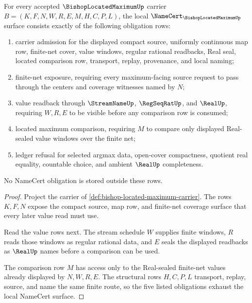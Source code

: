 \begin{theorem}
\label{thm:bishop-located-maximum-namecert-obligations}
For every accepted $\BishopLocatedMaximumUp$ carrier $B=(K,F,N,W,R,E,M,H,C,P,L)$, the local $\NameCert_{\BishopLocatedMaximumUp}$ surface consists exactly of the following obligation rows:
\begin{enumerate}
\item carrier admission for the displayed compact source, uniformly continuous map row, finite-net cover, value windows, regular rational readbacks, Real seal, located comparison row, transport, replay, provenance, and local naming;
\item finite-net exposure, requiring every maximum-facing source request to pass through the centers and coverage witnesses named by $N$;
\item value readback through $\StreamNameUp$, $\RegSeqRatUp$, and $\RealUp$, requiring $W,R,E$ to be visible before any comparison row is consumed;
\item located maximum comparison, requiring $M$ to compare only displayed Real-sealed value windows over the finite net;
\item ledger refusal for selected argmax data, open-cover compactness, quotient real equality, countable choice, and ambient $\RealUp$ completeness.
\end{enumerate}
No NameCert obligation is stored outside these rows.
\end{theorem}
\begin{proof}
Project the carrier of \autoref{def:bishop-located-maximum-carrier}. The rows $K,F,N$ expose the compact source, map row, and finite-net coverage surface that every later value read must use.

Read the value rows next. The stream schedule $W$ supplies finite windows, $R$ reads those windows as regular rational data, and $E$ seals the displayed readbacks as $\RealUp$ names before a comparison can be used.

The comparison row $M$ has access only to the Real-sealed finite-net values already displayed by $N,W,R,E$. The structural rows $H,C,P,L$ transport, replay, source, and name the same finite route, so the five listed obligations exhaust the local NameCert surface.
\end{proof}

